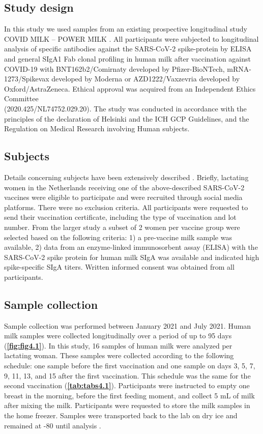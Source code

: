 \subsection{Study design}
In this study we used samples from an existing prospective longitudinal study COVID MILK – POWER MILK \cite{juncker2022comparing}. All participants were subjected to longitudinal analysis of specific antibodies against the SARS-CoV-2 spike-protein by ELISA and general SIgA1 Fab clonal profiling in human milk after vaccination against COVID-19 with BNT162b2/Comirnaty developed by Pfizer-BioNTech, mRNA-1273/Spikevax developed by Moderna or AZD1222/Vaxzevria developed by Oxford/AstraZeneca. Ethical approval was acquired from an Independent Ethics Committee\\
(2020.425/NL74752.029.20). The study was conducted in accordance with the principles of the declaration of Helsinki and the ICH GCP Guidelines, and the Regulation on Medical Research involving Human subjects.

\subsection{Subjects}
Details concerning subjects have been extensively described \cite{juncker2022comparing}. Briefly, lactating women in the Netherlands receiving one of the above-described SARS-CoV-2 vaccines were eligible to participate and were recruited through social media platforms. There were no exclusion criteria. All participants were requested to send their vaccination certificate, including the type of vaccination and lot number. From the larger study a subset of 2 women per vaccine group were selected based on the following criteria: 1) a pre-vaccine milk sample was available, 2) data from an enzyme-linked immunosorbent assay (ELISA) with the SARS-CoV-2 spike protein for human milk SIgA was available and indicated high spike-specific SIgA titers. Written informed consent was obtained from all participants.

\subsection{Sample collection}
Sample collection was performed between January 2021 and July 2021. Human milk samples were collected longitudinally over a period of up to 95 days (\textbf{\autoref{fig:fig4.1}}). In this study, 16 samples of human milk were analyzed per lactating woman. These samples were collected according to the following schedule: one sample before the first vaccination and one sample on days 3, 5, 7, 9, 11, 13, and 15 after the first vaccination. This schedule was the same for the second vaccination (\textbf{\autoref{tab:tabs4.1}}). Participants were instructed to empty one breast in the morning, before the first feeding moment, and collect 5 mL of milk after mixing the milk. Participants were requested to store the milk samples in the home freezer. Samples were transported back to the lab on dry ice and remained at -80 until analysis \cite{juncker2022comparing, keulen2021human}.

